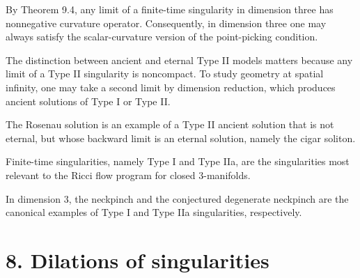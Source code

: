 \begin{remark}
\label{ch08-rem-dimension-three-scalar-curvature}
By Theorem 9.4, any limit of a finite-time singularity in dimension three has nonnegative curvature operator. Consequently, in dimension three one may always satisfy the scalar-curvature version of the point-picking condition.
\end{remark}

\begin{remark}
\label{ch08-rem-ancient-eternal-type-ii}
The distinction between ancient and eternal Type II models matters because any limit of a Type II singularity is noncompact. To study geometry at spatial infinity, one may take a second limit by dimension reduction, which produces ancient solutions of Type I or Type II.
\end{remark}

\begin{example}
\label{ch08-ex-rosenau-solution}
The Rosenau solution is an example of a Type II ancient solution that is not eternal, but whose backward limit is an eternal solution, namely the cigar soliton.
\end{example}

\begin{remark}
\label{ch08-rem-finite-time-singularities}
Finite-time singularities, namely Type I and Type IIa, are the singularities most relevant to the Ricci flow program for closed \(3\)-manifolds.
\end{remark}

\begin{example}
\label{ch08-ex-neckpinch-degenerate-neckpinch}
In dimension \(3\), the neckpinch and the conjectured degenerate neckpinch are the canonical examples of Type I and Type IIa singularities, respectively.
\end{example}

\section*{8. Dilations of singularities}


